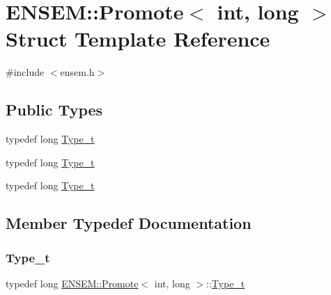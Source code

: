 \hypertarget{structENSEM_1_1Promote_3_01int_00_01long_01_4}{}\section{E\+N\+S\+EM\+:\+:Promote$<$ int, long $>$ Struct Template Reference}
\label{structENSEM_1_1Promote_3_01int_00_01long_01_4}


{\ttfamily \#include $<$ensem.\+h$>$}

\subsection*{Public Types}
\begin{DoxyCompactItemize}
\item 
typedef long \mbox{\hyperlink{structENSEM_1_1Promote_3_01int_00_01long_01_4_a54e18c0fbe5235d06120945bf82c21e4}{Type\+\_\+t}}
\item 
typedef long \mbox{\hyperlink{structENSEM_1_1Promote_3_01int_00_01long_01_4_a54e18c0fbe5235d06120945bf82c21e4}{Type\+\_\+t}}
\item 
typedef long \mbox{\hyperlink{structENSEM_1_1Promote_3_01int_00_01long_01_4_a54e18c0fbe5235d06120945bf82c21e4}{Type\+\_\+t}}
\end{DoxyCompactItemize}


\subsection{Member Typedef Documentation}
\mbox{\label{structENSEM_1_1Promote_3_01int_00_01long_01_4_a54e18c0fbe5235d06120945bf82c21e4}} 
\subsubsection{\texorpdfstring{Type\_t}{Type\_t}\hspace{0.1cm}{\footnotesize\ttfamily [1/3]}}
{\footnotesize\ttfamily typedef long \mbox{\hyperlink{structENSEM_1_1Promote}{E\+N\+S\+E\+M\+::\+Promote}}$<$ int, long $>$\+::\mbox{\hyperlink{structENSEM_1_1Promote_3_01int_00_01long_01_4_a54e18c0fbe5235d06120945bf82c21e4}{Type\+\_\+t}}}

\mbox{\label{structENSEM_1_1Promote_3_01int_00_01long_01_4_a54e18c0fbe5235d06120945bf82c21e4}} 
